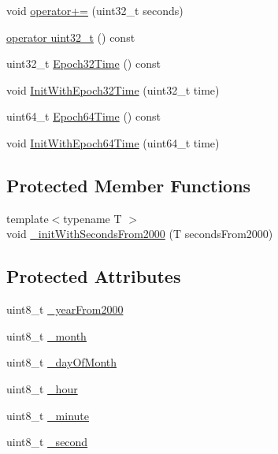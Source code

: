 \begin{DoxyCompactItemize}
\item 
void \hyperlink{class_rtc_date_time_a6c43d51a9bd1a004e4d2a3eb1a8da84e}{operator+=} (uint32\+\_\+t seconds)
\item 
\hyperlink{class_rtc_date_time_af12e82c0f9cbe28d81ddb78e6316e0ee}{operator uint32\+\_\+t} () const 
\item 
uint32\+\_\+t \hyperlink{class_rtc_date_time_a77286613a3bbdda951a479158d53e53b}{Epoch32\+Time} () const 
\item 
void \hyperlink{class_rtc_date_time_afeb3551f82aa838fdb6347dc73c1f8e4}{Init\+With\+Epoch32\+Time} (uint32\+\_\+t time)
\item 
uint64\+\_\+t \hyperlink{class_rtc_date_time_a2ebb0cba0b82274a166daa618b4213cb}{Epoch64\+Time} () const 
\item 
void \hyperlink{class_rtc_date_time_a23fa488b500d4968a4619093005e5212}{Init\+With\+Epoch64\+Time} (uint64\+\_\+t time)
\end{DoxyCompactItemize}
\subsection*{Protected Member Functions}
\begin{DoxyCompactItemize}
\item 
{\footnotesize template$<$typename T $>$ }\\void \hyperlink{class_rtc_date_time_a60b21b4d2186c7daf8ed94a750e10f3a}{\+\_\+init\+With\+Seconds\+From2000} (T seconds\+From2000)
\end{DoxyCompactItemize}
\subsection*{Protected Attributes}
\begin{DoxyCompactItemize}
\item 
uint8\+\_\+t \hyperlink{class_rtc_date_time_a782f920fa91c813d1f34116f8ef58e17}{\+\_\+year\+From2000}
\item 
uint8\+\_\+t \hyperlink{class_rtc_date_time_ac330113b94c1bc110ad7dbc3a263f03a}{\+\_\+month}
\item 
uint8\+\_\+t \hyperlink{class_rtc_date_time_a12da2c12bb874dd069e092f9998c0e0c}{\+\_\+day\+Of\+Month}
\item 
uint8\+\_\+t \hyperlink{class_rtc_date_time_a93fcc560a087734a015cf63477708a78}{\+\_\+hour}
\item 
uint8\+\_\+t \hyperlink{class_rtc_date_time_a9f29cd580a5c8a60212cb96a553865cf}{\+\_\+minute}
\item 
uint8\+\_\+t \hyperlink{class_rtc_date_time_ad3c0899907fa14a51be81be3122d0a80}{\+\_\+second}
\end{DoxyCompactItemize}


